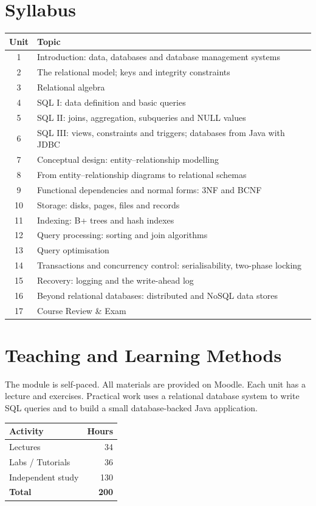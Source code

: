 \documentclass[11pt,a4paper]{article}
\begin{document}
\section{Syllabus}
\begin{tabularx}{\textwidth}{c X}
\toprule
\textbf{Unit} & \textbf{Topic} \\
\midrule
1  & Introduction: data, databases and database management systems \\
2  & The relational model; keys and integrity constraints \\
3  & Relational algebra \\
4  & SQL I: data definition and basic queries \\
5  & SQL II: joins, aggregation, subqueries and NULL values \\
6  & SQL III: views, constraints and triggers; databases from Java with JDBC \\
7  & Conceptual design: entity--relationship modelling \\
8  & From entity--relationship diagrams to relational schemas \\
9  & Functional dependencies and normal forms: 3NF and BCNF \\
10 & Storage: disks, pages, files and records \\
11 & Indexing: B+ trees and hash indexes \\
12 & Query processing: sorting and join algorithms \\
13 & Query optimisation \\
14 & Transactions and concurrency control: serialisability, two-phase locking \\
15 & Recovery: logging and the write-ahead log \\
16 & Beyond relational databases: distributed and NoSQL data stores \\
17 & Course Review \& Exam \\
\bottomrule
\end{tabularx}

\section{Teaching and Learning Methods}
The module is self-paced. All materials are provided on Moodle.
Each unit has a lecture and exercises. Practical work uses a relational database
system to write SQL queries and to build a small database-backed Java application.

\begin{tabularx}{0.6\textwidth}{X r}
\toprule
\textbf{Activity} & \textbf{Hours} \\
\midrule
Lectures            & 34 \\
Labs / Tutorials    & 36 \\
Independent study   & 130 \\
\midrule
\textbf{Total}      & \textbf{200} \\
\bottomrule
\end{tabularx}
\end{document}
